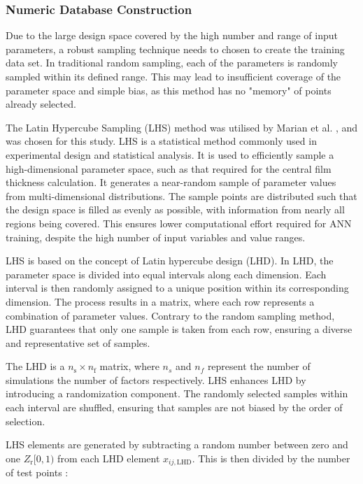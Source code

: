 \subsubsection{Numeric Database Construction}

Due to the large design space covered by the high number and range of input parameters, a robust sampling technique needs to chosen to create the training data set. In traditional random sampling, each of the parameters is randomly sampled within its defined range. This may lead to insufficient coverage of the parameter space and simple bias, as this method has no "memory" of points already selected.

The Latin Hypercube Sampling (LHS) method was utilised by Marian et al. \cite{Marian2022}, and was chosen for this study. LHS is a statistical method commonly used in experimental design and statistical analysis. It is used to efficiently sample a high-dimensional parameter space, such as that required for the central film thickness calculation. It generates a near-random sample of parameter values from multi-dimensional distributions. The sample points are distributed such that the design space is filled as evenly as possible, with information from nearly all regions being covered. This ensures lower computational effort required for ANN training, despite the high number of input variables and value ranges. 

LHS is based on the concept of Latin hypercube design (LHD). In LHD, the parameter space is divided into equal intervals along each dimension. Each interval is then randomly assigned to a unique position within its corresponding dimension. The process results in a matrix, where each row represents a combination of parameter values. Contrary to the random sampling method, LHD guarantees that only one sample is taken from each row, ensuring a diverse and representative set of samples.

The LHD is a $n_{\mathrm{s}} \times n_{\mathrm{f}}$ matrix, where $n_s$ and $n_f$ represent the number of simulations the number of factors respectively. LHS enhances LHD by introducing a randomization component. The randomly selected samples within each interval are shuffled, ensuring that samples are not biased by the order of selection.

LHS elements are generated by subtracting a random number between zero and one $Z_{\mathrm{r}}[0,1)$ from each LHD element $x_{i j, \mathrm{LHD}}$. This is then divided by the number of test points \cite{Siebertz2010}:

